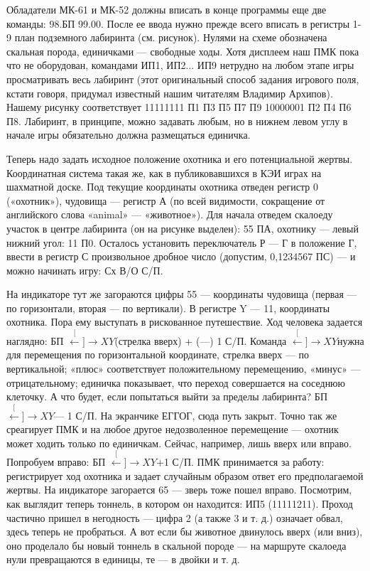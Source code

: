 \documentclass[11pt,a4paper,oneside]{article}
\def\XY{$\stackrel[\leftarrow]{\rightarrow}{XY}$}
\begin{document}
Обладатели МК-61 и МК-52 должны вписать в конце программы еще две команды: 98.БП 99.00. После ее ввода нужно прежде всего вписать в регистры 1-9 план подземного лабиринта (см. рисунок). Нулями на схеме обозначена скальная порода, единичками — свободные ходы. Хотя дисплеем наш ПМК пока что не оборудован, командами ИП1, ИП2... ИП9 нетрудно на любом этапе игры просматривать весь лабиринт (этот оригинальный способ задания игрового поля, кстати говоря, придумал известный нашим читателям Владимир Архипов). Нашему рисунку соответствует 11111111 П1 П3 П5 П7 П9 10000001 П2 П4 П6 П8. Лабиринт, в принципе, можно задавать любым, но в нижнем левом углу в начале игры обязательно должна размещаться единичка.

Теперь надо задать исходное положение охотника и его потенциальной жертвы. Координатная система такая же, как в публиковавшихся в КЭИ играх на шахматной доске. Под текущие координаты охотника отведен регистр 0 («охотник»), чудовища — регистр А (по всей видимости, сокращение от английского слова «animal» — «животное»). Для начала отведем скалоеду участок в центре лабиринта (он на рисунке выделен): 55 ПА, охотнику — левый нижний угол: 11 П0. Осталось установить переключатель Р — Г в положение Г, ввести в регистр С произвольное дробное число (допустим, 0,1234567 ПС) — и можно начинать игру: Сх В/О С/П.

На индикаторе тут же загораются цифры 55 — координаты чудовища (первая — по горизонтали, вторая — по вертикали). В регистре Y — 11, координаты охотника. Пора ему выступать в рискованное путешествие. Ход человека задается наглядно: БП \XY (стрелка вверх) + (—) 1 С/П. Команда \XY нужна для перемещения по горизонтальной координате, стрелка вверх — по вертикальной; «плюс» соответствует положительному перемещению, «минус» — отрицательному; единичка показывает, что переход совершается на соседнюю клеточку. А что будет, если попытаться выйти за пределы лабиринта? БП \XY — 1 С/П. На экранчике ЕГГОГ, сюда путь закрыт. Точно так же среагирует ПМК и на любое другое недозволенное перемещение — охотник может ходить только по единичкам. Сейчас, например, лишь вверх или вправо. Попробуем вправо: БП \XY +1 С/П. ПМК принимается за работу: регистрирует ход охотника и задает случайным образом ответ его предполагаемой жертвы. На индикаторе загорается 65 — зверь тоже пошел вправо. Посмотрим, как выглядит теперь тоннель, в котором он находится: ИП5 (11111211). Проход частично пришел в негодность — цифра 2 (а также 3 и т. д.) означает обвал, здесь теперь не пробраться. А вот если бы животное двинулось вверх (или вниз), оно проделало бы новый тоннель в скальной породе — на маршруте скалоеда нули превращаются в единицы, те — в двойки и т. д.
\end{document}
